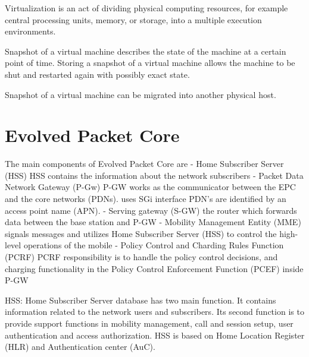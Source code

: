 Virtualization is an act of dividing physical computing resources, for example central processing units, memory, or storage, into a multiple execution environments.

Snapshot of a virtual machine describes the state of the machine at a certain point of time. Storing a snapshot of a virtual machine allows the machine to be shut and restarted again with possibly exact state.

Snapshot of a virtual machine can be migrated into another physical host.

\section{Evolved Packet Core}
\label{section:evolved-packet-core}

The main components of Evolved Packet Core are
  - Home Subscriber Server (HSS)
    HSS contains the information about the network subscribers
  - Packet Data Network Gateway (P-Gw)
    P-GW works as the communicator between the EPC and the core networks (PDNs).
    uses SGi interface
    PDN's are identified by an access point name (APN).
  - Serving gateway (S-GW)
    the router which forwards data between the base station and P-GW
  - Mobility Management Entity (MME)
    signals messages and utilizes Home Subscriber Server (HSS) to control the high-level operations of the mobile
  - Policy Control and Charding Rules Function (PCRF)
    PCRF responsibility is to handle the policy control decisions, and charging functionality in the Policy Control Enforcement Function (PCEF) inside P-GW


HSS:
Home Subscriber Server database has two main function. It contains information related to the network users and subscribers. Its second function is to provide support functions in mobility management, call and session setup, user authentication and access authorization. HSS is based on Home Location Register (HLR) and Authentication center (AuC).


